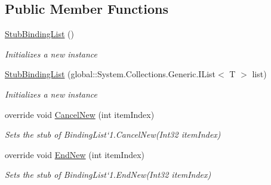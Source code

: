 \subsection*{Public Member Functions}
\begin{DoxyCompactItemize}
\item 
\hyperlink{class_system_1_1_component_model_1_1_fakes_1_1_stub_binding_list_3_01_t_01_4_a65cd94c75ceea8722f82aa42550ff6d4}{Stub\-Binding\-List} ()
\begin{DoxyCompactList}\small\item\em Initializes a new instance\end{DoxyCompactList}\item 
\hyperlink{class_system_1_1_component_model_1_1_fakes_1_1_stub_binding_list_3_01_t_01_4_a51d10540e9e35f7e862a8fd3df2b519f}{Stub\-Binding\-List} (global\-::\-System.\-Collections.\-Generic.\-I\-List$<$ T $>$ list)
\begin{DoxyCompactList}\small\item\em Initializes a new instance\end{DoxyCompactList}\item 
override void \hyperlink{class_system_1_1_component_model_1_1_fakes_1_1_stub_binding_list_3_01_t_01_4_acd685e2c9305c0372f38d3c3b6a715a2}{Cancel\-New} (int item\-Index)
\begin{DoxyCompactList}\small\item\em Sets the stub of Binding\-List`1.Cancel\-New(\-Int32 item\-Index)\end{DoxyCompactList}\item 
override void \hyperlink{class_system_1_1_component_model_1_1_fakes_1_1_stub_binding_list_3_01_t_01_4_aa1c20bef8df9530f01859d9b173b09e9}{End\-New} (int item\-Index)
\begin{DoxyCompactList}\small\item\em Sets the stub of Binding\-List`1.End\-New(\-Int32 item\-Index)\end{DoxyCompactList}\end{DoxyCompactItemize}

